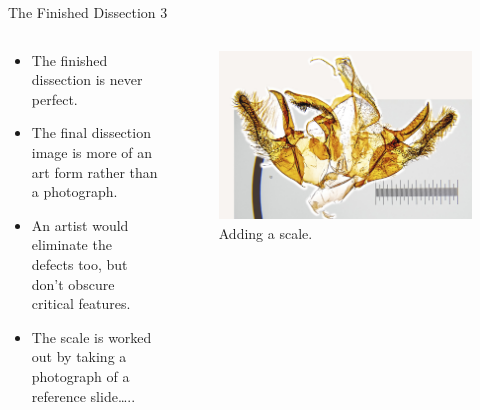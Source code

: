 \documentclass[
  ignorenonframetext,
]{beamer}
\providecommand{\tightlist}{%
  \setlength{\itemsep}{0pt}\setlength{\parskip}{0pt}}
\begin{document}
\begin{frame}{The Finished Dissection 3}
\protect\hypertarget{the-finished-dissection-3}{}
\begin{columns}[T]
\begin{column}{0.5\textwidth}
\begin{itemize}
\tightlist
\item
  The finished dissection is never perfect.
\item
  The final dissection image is more of an art form rather than a
  photograph.
\item
  An artist would eliminate the defects too, but don't obscure critical
  features.
\item
  The scale is worked out by taking a photograph of a reference
  slide\ldots..
\end{itemize}
\end{column}

\begin{column}{0.5\textwidth}
\begin{figure}
\centering
\includegraphics{./images/PJP20220218-001-getting-scale.jpg}
\caption{Adding a scale.}
\end{figure}
\end{column}
\end{columns}
\end{frame}
\end{document}
